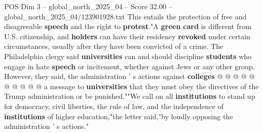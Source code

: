 \begin{textsample}{POS Dim 3 – global\_north\_2025\_04 – Score 32.00 – global\_north\_2025\_04/123901928.txt}
This entails the protection of free and disagreeable \textbf{speech} and the right to \textbf{protest}."A \textbf{green} \textbf{card} is different from U.S. citizenship, and \textbf{holders} can have their residency \textbf{revoked} under certain circumstances, usually after they have been convicted of a crime.
The Philadelphia clergy said \textbf{universities} can and should discipline \textbf{students} who engage in hate \textbf{speech} or incitement, whether against Jews or any other group.
However, they said, the administration ' s actions against \textbf{colleges} @ @ @ @ @ @ @ @ @ @ a message to \textbf{universities} that they must obey the directives of the Trump administration or be punished.""We call on all \textbf{institutions} to stand up for democracy, civil liberties, the rule of law, and the independence of \textbf{institutions} of higher education,"the letter said,"by loudly opposing the administration ' s actions."

\end{textsample}
